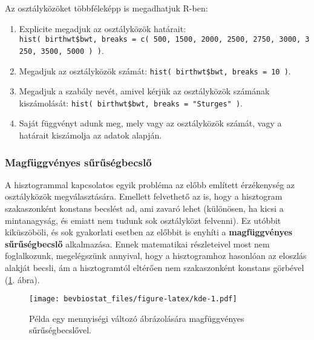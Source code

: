\documentclass[
]{book}
\newenvironment{Shaded}{\begin{snugshade}}{\end{snugshade}}
\newcommand{\AttributeTok}[1]{\textcolor[rgb]{0.77,0.63,0.00}{#1}}
\newcommand{\FunctionTok}[1]{\textcolor[rgb]{0.00,0.00,0.00}{#1}}
\newcommand{\NormalTok}[1]{#1}
\newcommand{\SpecialCharTok}[1]{\textcolor[rgb]{0.00,0.00,0.00}{#1}}
\newcommand{\StringTok}[1]{\textcolor[rgb]{0.31,0.60,0.02}{#1}}
\providecommand{\tightlist}{%
  \setlength{\itemsep}{0pt}\setlength{\parskip}{0pt}}
\begin{document}
Az osztályközöket többféleképp is megadhatjuk R-ben:

\begin{enumerate}
\def\labelenumi{\arabic{enumi}.}
\tightlist
\item
  Explicite megadjuk az osztályközök határait: \texttt{hist(\ birthwt\$bwt,\ breaks\ =\ c(\ 500,\ 1500,\ 2000,\ 2500,\ 2750,\ 3000,\ 3250,\ 3500,\ 5000\ )\ )}.
\item
  Megadjuk az osztályközök számát: \texttt{hist(\ birthwt\$bwt,\ breaks\ =\ 10\ )}.
\item
  Megadjuk a szabály nevét, amivel kérjük az osztályközök számának kiszámolását: \texttt{hist(\ birthwt\$bwt,\ breaks\ =\ "Sturges"\ )}.
\item
  Saját függvényt adunk meg, mely vagy az osztályközök számát, vagy a határait kiszámolja az adatok alapján.
\end{enumerate}

\hypertarget{deskriptivmennyegyvaltgrafikuskde}{%
\subsubsection{Magfüggvényes sűrűségbecslő}\label{deskriptivmennyegyvaltgrafikuskde}}

A hisztogrammal kapcsolatos egyik probléma az előbb említett érzékenység az osztályközök megválasztására. Emellett felvethető az is, hogy a hisztogram szakaszonként konstans becslést ad, ami zavaró lehet (különösen, ha kicsi a mintanagyság, és emiatt nem tudunk sok osztályközt felvenni). Ez utóbbit kiküszöböli, és sok gyakorlati esetben az előbbit is enyhíti a \textbf{magfüggvényes sűrűségbecslő} alkalmazása. Ennek matematikai részleteivel most nem foglalkozunk, megelégszünk annyival, hogy a hisztogramhoz hasonlóan az eloszlás alakját becsli, ám a hisztogramtól eltérően nem szakaszonként konstans görbével (\ref{fig:kde}. ábra).

\begin{Shaded}
\end{Shaded}

\begin{figure}
\centering
\texttt{[image: bevbiostat\_files/figure-latex/kde-1.pdf]}
\caption{\label{fig:kde}Példa egy mennyiségi változó ábrázolására magfüggvényes sűrűségbecslővel.}
\end{figure}
\end{document}
